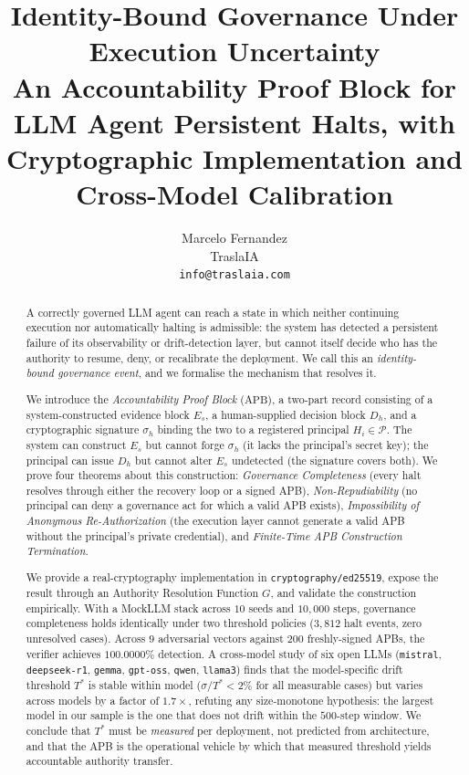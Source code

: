 \documentclass[11pt]{article}
\title{\textbf{Identity-Bound Governance Under Execution Uncertainty}\\[4pt]
       \large An Accountability Proof Block for LLM Agent Persistent Halts,
       with Cryptographic Implementation and Cross-Model Calibration}
\author{Marcelo Fernandez\\
        \small TraslaIA\\
        \small \texttt{info@traslaia.com}}
\date{}
\newcommand{\Pset}{\mathcal{P}}
\newcommand{\Es}{E_s}
\newcommand{\Dh}{D_h}
\newcommand{\sigh}{\sigma_h}
\newcommand{\Hi}{H_i}
\newcommand{\Tstar}{T^*}
\newcommand{\APB}{\mathrm{APB}}
\begin{document}
\maketitle

\begin{abstract}
\noindent
A correctly governed LLM agent can reach a state in which neither continuing
execution nor automatically halting is admissible: the system has detected a
persistent failure of its observability or drift-detection layer, but cannot
itself decide who has the authority to resume, deny, or recalibrate the
deployment. We call this an \emph{identity-bound governance event}, and we
formalise the mechanism that resolves it.

We introduce the \emph{Accountability Proof Block} ($\APB$), a two-part
record consisting of a system-constructed evidence block $\Es$, a
human-supplied decision block $\Dh$, and a cryptographic signature $\sigh$
binding the two to a registered principal $\Hi \in \Pset$. The system can
construct $\Es$ but cannot forge $\sigh$ (it lacks the principal's secret
key); the principal can issue $\Dh$ but cannot alter $\Es$ undetected (the
signature covers both).
We prove four theorems about this construction:
\emph{Governance Completeness} (every halt resolves through either the
recovery loop or a signed APB), \emph{Non-Repudiability} (no principal can
deny a governance act for which a valid APB exists),
\emph{Impossibility of Anonymous Re-Authorization} (the execution layer
cannot generate a valid APB without the principal's private credential),
and \emph{Finite-Time APB Construction Termination}.

We provide a real-cryptography implementation in
\texttt{cryptography/ed25519}, expose the result through an Authority
Resolution Function $G$, and validate the construction empirically. With a
MockLLM stack across $10$ seeds and $10{,}000$ steps, governance completeness
holds identically under two threshold policies ($3{,}812$ halt events,
zero unresolved cases). Across $9$ adversarial vectors against
$200$ freshly-signed APBs, the verifier achieves $100.0000\%$ detection.
A cross-model study of six open LLMs (\texttt{mistral}, \texttt{deepseek-r1},
\texttt{gemma}, \texttt{gpt-oss}, \texttt{qwen}, \texttt{llama3}) finds
that the model-specific drift threshold $\Tstar$ is stable within model
($\sigma/\Tstar < 2\%$ for all measurable cases) but varies across models
by a factor of $1.7\times$, refuting any size-monotone hypothesis: the
largest model in our sample is the one that does not drift within the
$500$-step window. We conclude that $\Tstar$ must be \emph{measured}
per deployment, not predicted from architecture, and that the APB is the
operational vehicle by which that measured threshold yields accountable
authority transfer.
\end{abstract}
\end{document}
